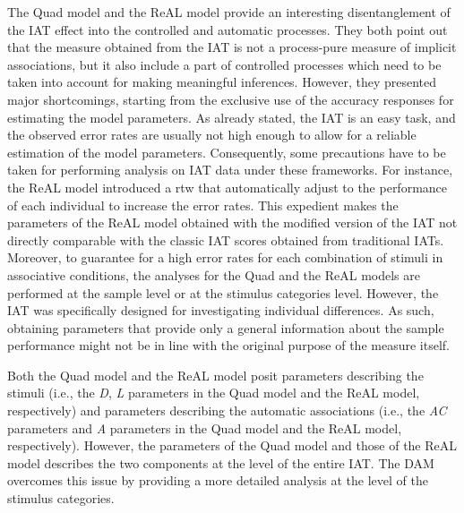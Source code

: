 \documentclass[12pt]{book}
\begin{document}
The Quad model and the ReAL model provide an interesting disentanglement of the IAT effect into the controlled and automatic processes. They both point out that the measure obtained from the IAT is not a process-pure measure of implicit associations, but it also include a part of controlled processes which need to be taken into account for making meaningful inferences. 
However, they presented major shortcomings, starting from the exclusive use of the accuracy responses for estimating the model parameters. 
As already stated, the IAT is an easy task, and the observed error rates are usually not high enough to allow for a reliable estimation of the model parameters. Consequently, some precautions have to be taken for performing analysis on IAT data under these frameworks. 
For instance, the ReAL model introduced a rtw that automatically adjust  to the performance of each individual to increase the error rates. 
This expedient makes the parameters of the ReAL model obtained with the modified version of the IAT not directly comparable with the classic IAT scores obtained from traditional IATs. 
Moreover, to guarantee for a high error rates for each combination of stimuli in associative conditions, the analyses for the Quad and the ReAL models are performed at the sample level or at the stimulus categories level. However, the IAT was specifically designed for investigating individual differences. As such, obtaining parameters that provide only a general information about the sample performance might not be in line with the original purpose of the measure itself. 

Both the Quad model and the ReAL model  posit parameters describing the stimuli (i.e., the \emph{D}, \emph{L} parameters in the Quad model and the ReAL model, respectively) and parameters describing the automatic associations (i.e., the \emph{AC} parameters and \emph{A} parameters in the Quad model and the ReAL model, respectively). 
However, the parameters of the Quad model and those of the ReAL model describes the two components at the level of the entire IAT. 
The DAM overcomes this issue by providing a more detailed analysis at the level of the stimulus categories.
\end{document}
